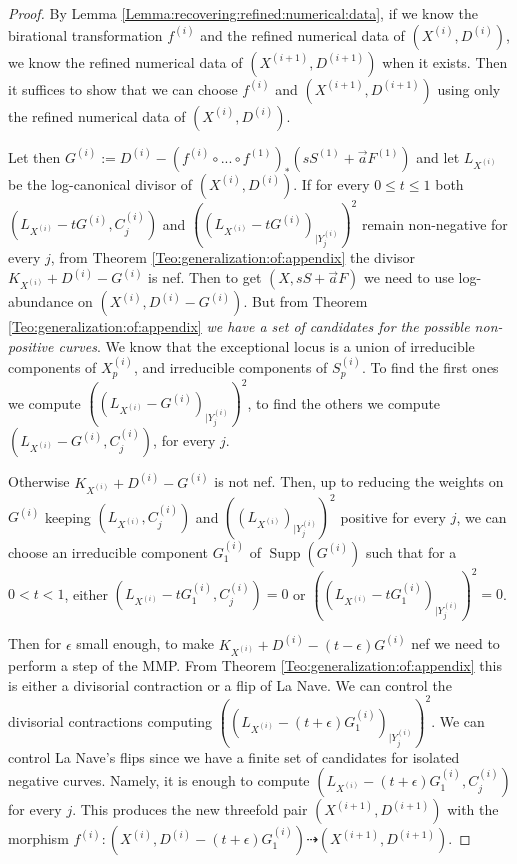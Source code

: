 \documentclass[11pt]{amsart}
\newcommand{\supp}{\operatorname{Supp}}
\theoremstyle{definition}
\begin{document}
\begin{proof}
 By Lemma \ref{Lemma:recovering:refined:numerical:data}, if we know the birational transformation $f^{(i)}$ and the refined numerical data of
 $(X^{(i)},D^{(i)})$, we know the refined numerical data of $(X^{(i+1)},D^{(i+1)})$ when it exists. Then
 it suffices to show that we can choose $f^{(i)}$ and $(X^{(i+1)},D^{(i+1)})$ using only the refined numerical data of $(X^{(i)},D^{(i)})$. 
 
 Let then $G^{(i)}:=D^{(i)}-(f^{(i)} \circ... \circ f^{(1)})_*( sS^{(1)}+\vec{a}F^{(1)})$ and let $L_{X^{(i)}}$ be the log-canonical divisor of
$(X^{(i)},D^{(i)})$. If
 for every $0 \le t \le 1$ both $(L_{X^{(i)}}-tG^{(i)},C_j^{(i)})$ and
$((L_{X^{(i)}}-tG^{(i)})_{|Y^{(i)}_j})^2$ remain non-negative for every $j$, from Theorem
 \ref{Teo:generalization:of:appendix} the divisor $K_{X^{(i)}}+D^{(i)}-G^{(i)}$ is nef.
 Then to get $(X,sS+\vec{a}F)$ we need to use log-abundance on
 $(X^{(i)},D^{(i)}-G^{(i)})$. But from Theorem \ref{Teo:generalization:of:appendix} \emph{we have a set of candidates for the possible non-positive curves}. We know that the exceptional locus is a union of irreducible components of $X^{(i)}_p$,
and irreducible components of $S^{(i)}_p$. To find the first ones we compute $((L_{X^{(i)}}-G^{(i)})_{|Y^{(i)}_j})^2$,
to find the others we compute $(L_{X^{(i)}}-G^{(i)},C_j^{(i)})$, for every $j$.

Otherwise $K_{X^{(i)}}+D^{(i)}-G^{(i)}$ is not nef. Then, up to reducing the weights on $G^{(i)}$ keeping $(L_{X^{(i)}},C_j^{(i)})$ and
$((L_{X^{(i)}})_{|Y^{(i)}_j})^2$ positive for every $j$, we can choose
an irreducible component $G_1^{(i)}$ of $\supp(G^{(i)})$ such that for a $0 < t <1$, either
$(L_{X^{(i)}}-tG_1^{(i)},C_j^{(i)})= 0$ or 
$((L_{X^{(i)}}-tG_1^{(i)})_{|Y^{(i)}_j})^2 = 0$.

 Then for $\epsilon$ small enough, to make $K_{X^{(i)}}+D^{(i)}-(t-\epsilon)G^{(i)}$ nef we need to perform a step of the MMP.
 From Theorem \ref{Teo:generalization:of:appendix} this is either a divisorial contraction or a flip of La Nave.
 We can control the divisorial
contractions computing $((L_{X^{(i)}}-(t+\epsilon)G^{(i)}_1)_{|Y^{(i)}_j})^2$. We can control La Nave's flips since we have a finite set of candidates
for isolated negative curves.
Namely, it is enough to compute $(L_{X^{(i)}}-(t+\epsilon)G^{(i)}_1,C_j^{(i)})$ for every $j$.
This produces the new threefold pair $(X^{(i+1)},D^{(i+1)})$ with the morphism
$f^{(i)}:(X^{(i)},D^{(i)}-(t+\epsilon)G_1^{(i)}) \dashrightarrow (X^{(i+1)},D^{(i+1)})$. \end{proof}
\end{document}
